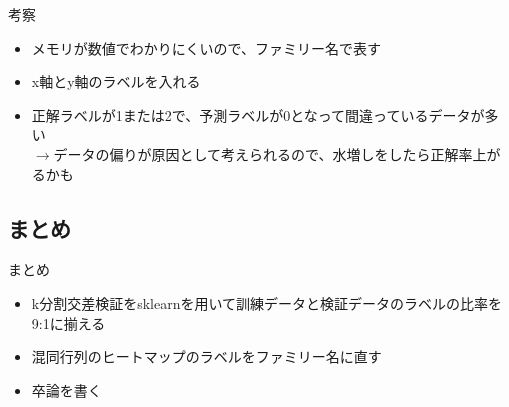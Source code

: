 \documentclass{beamer}
\begin{document}
  \begin{frame}{考察}
    \begin{itemize}
      \item メモリが数値でわかりにくいので、ファミリー名で表す
      \item x軸とy軸のラベルを入れる
      \item 正解ラベルが1または2で、予測ラベルが0となって間違っているデータが多い \mbox{}\\ $\rightarrow$データの偏りが原因として考えられるので、水増しをしたら正解率上がるかも
    \end{itemize}
  \end{frame}

  \begin{frame}
    \section{まとめ}
  \end{frame}

  \begin{frame}{まとめ}
    \begin{itemize}
      \item k分割交差検証をsklearnを用いて訓練データと検証データのラベルの比率を9:1に揃える
      \item 混同行列のヒートマップのラベルをファミリー名に直す
      \item 卒論を書く
    \end{itemize}
  \end{frame}
\end{document}
